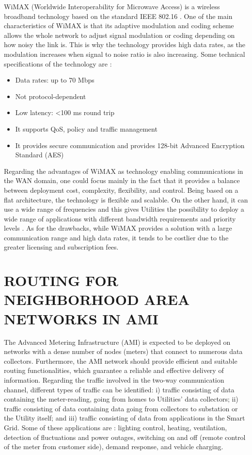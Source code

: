 \documentclass[10pt,twocolumn,twoside,submit]{JCNtran}
\begin{document}
WiMAX (Worldwide Interoperability for Microwave Access) is a wireless broadband technology based on the standard IEEE 802.16 \cite{IEEE80216}. One of the main characteristics of WiMAX is that its adaptive modulation and coding scheme allows the whole network to adjust signal  modulation or coding depending on how noisy the link is. This is why the technology provides high data rates, as the modulation increases when signal to noise ratio is also increasing. Some technical specifications of the technology are \cite{Aguirre2013}:

\begin{itemize}

	\item Data rates: up to 70 Mbps
	\item Not protocol-dependent
	\item Low latency: <100 ms round trip
	\item It supports QoS, policy and traffic management
	\item It provides secure communication and provides 128-bit Advanced Encryption Standard (AES)

\end{itemize}

Regarding the advantages of WiMAX as technology enabling communications in the WAN domain, one could focus mainly in the fact that it provides a balance between deployment cost, complexity, flexibility, and control. Being based on a flat architecture, the technology is flexible and scalable. On the other hand, it can use a wide range of frequencies and this gives Utilities the possibility to deploy a wide range of applications with different bandwidth requirements and priority levels \cite{Senza2010}. As for the drawbacks, while WiMAX provides a solution with a large communication range and high data rates, it tends to be costlier due to the greater licensing and subscription fees.

\vspace{10pt}
\section{\uppercase{Routing for Neighborhood Area Networks in AMI}}
\label{sec:routing}


The Advanced Metering Infrastructure (AMI) is expected to be deployed on networks with a dense number of nodes (meters) that connect to numerous data collectors. Furthermore, the AMI network should provide efficient and suitable routing functionalities, which guarantee a reliable and effective delivery of information. Regarding the traffic involved in the two-way communication channel, different types of traffic can be identified: i) traffic consisting of data containing the meter-reading, going from homes to Utilities' data collectors; ii) traffic consisting of data containing data going from collectors to substation or the Utility itself; and iii) traffic consisting of data from applications in the Smart Grid. Some of these applications are \cite{Tan2011}: lighting control, heating, ventilation, detection of fluctuations and power outages, switching on and off (remote control of the meter from customer side), demand response, and vehicle charging. 
\end{document}
